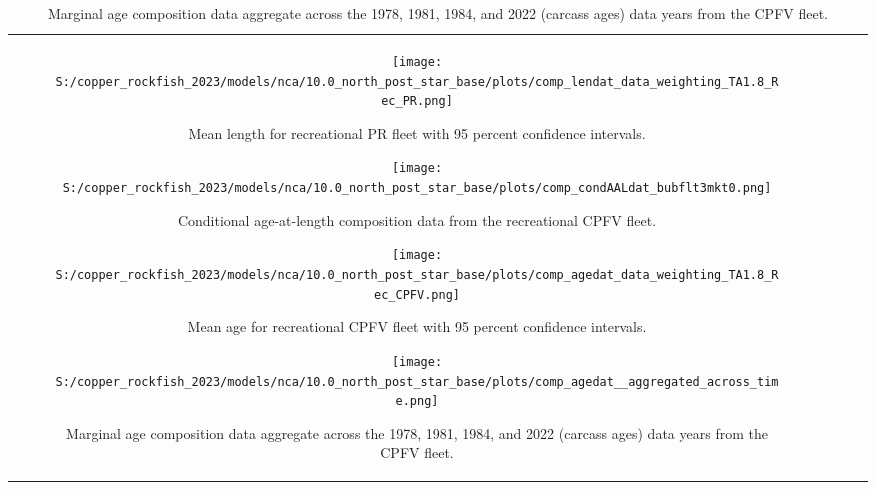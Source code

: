 \documentclass[11pt,
  letterpaper,
]{article}
\begin{document}
\begin{longtable}[t]{c>{\centering\arraybackslash}p{2cm}>{\centering\arraybackslash}p{2cm}>{\centering\arraybackslash}p{2cm}}
\begin{figure}
{\centering
\texttt{[image: S:/copper\_rockfish\_2023/models/nca/10.0\_north\_post\_star\_base/plots/comp\_lendat\_data\_weighting\_TA1.8\_Rec\_PR.png]}
}
\caption{Mean length for recreational PR fleet with 95 percent confidence intervals.\label{fig:mean-rec-pr-len-data}}
\end{figure}

\begin{figure}
{\centering
\texttt{[image: S:/copper\_rockfish\_2023/models/nca/10.0\_north\_post\_star\_base/plots/comp\_condAALdat\_bubflt3mkt0.png]}
}
\caption{Conditional age-at-length composition data from the recreational CPFV fleet.\label{fig:rec-cpfv-caal-data}}
\end{figure}

\pagebreak

\begin{figure}
{\centering
\texttt{[image: S:/copper\_rockfish\_2023/models/nca/10.0\_north\_post\_star\_base/plots/comp\_agedat\_data\_weighting\_TA1.8\_Rec\_CPFV.png]}
}
\caption{Mean age for recreational CPFV fleet with 95 percent confidence intervals.\label{fig:mean-rec-cpfv-age-data}}
\end{figure}

\begin{figure}
{\centering
\texttt{[image: S:/copper\_rockfish\_2023/models/nca/10.0\_north\_post\_star\_base/plots/comp\_agedat\_\_aggregated\_across\_time.png]}
}
\caption{Marginal age composition data aggregate across the 1978, 1981, 1984, and 2022 (carcass ages) data years from the CPFV fleet.\label{fig:rec-cpfv-marg-age-data}}
\end{figure}

\pagebreak


\end{longtable}
\end{document}
